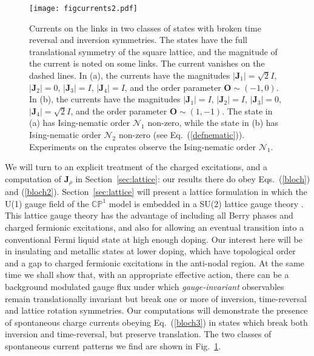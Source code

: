 \documentclass[aps,prb,preprint,onecolumn,citeautoscript,superscriptaddress,footinbib,
eqsecnum]{revtex4-1}
\begin{document}
\begin{figure}
\begin{center}
\texttt{[image: figcurrents2.pdf]}
\end{center}
\caption{Currents on the links in two classes of states with broken time reversal and inversion symmetries.
The states have the full translational symmetry of the
square lattice, and the magnitude of the current is noted on some links. The current vanishes on the dashed lines. In (a), the currents have the magnitudes $|{\bm J}_1| = \sqrt{2} I$, $|{\bm J}_2| = 0$, $|{\bm J}_3| = I$, $|{\bm J}_4| = I$, and the order parameter ${\bm O} \sim (-1,0)$.
In (b), the currents have the magnitudes $|{\bm J}_1| =  I$, $|{\bm J}_2| = I$, $|{\bm J}_3| = 0$, $|{\bm J}_4| = \sqrt{2} I$, and the order parameter ${\bm O} \sim (1,-1)$. The state in (a) has Ising-nematic order $\mathcal{N}_1$ non-zero, while the state in (b) has Ising-nematic order
$\mathcal{N}_2$ non-zero (see Eq.~(\ref{defnematic})). Experiments on the cuprates \cite{2002PhRvL..88m7005A,Hinkov597,2010Natur.463..519D,2010Natur.466..347L} observe the Ising-nematic order $\mathcal{N}_1$.
}
\label{fig:currents2}
\end{figure}
We will turn to an explicit treatment of the charged excitations, and a computation of ${\bm J}_{\rho}$ in Section~\ref{sec:lattice}: our results there do obey Eqs.~(\ref{bloch}) and (\ref{bloch2}). 
Section~\ref{sec:lattice} 
will present a lattice formulation in which the U(1) gauge field of the $\mathbb{CP}^1$ model is embedded in a SU(2) lattice gauge theory \cite{SS09,DCSS15b,DCSS16,2016PhRvB..94k5147S}. This lattice gauge theory 
has the advantage of including all Berry phases and charged fermionic excitations,  and also for allowing an eventual
transition into a conventional Fermi liquid state at high enough doping. Our interest here will be in insulating and metallic states at lower
doping, which have topological order and a gap to charged fermionic excitations in the anti-nodal region. At the same time we shall show that, with an appropriate
effective action, there can be a background modulated gauge flux under which {\it gauge-invariant} 
observables remain translationally invariant
but break one or more of inversion, time-reversal and lattice rotation symmetries. Our computations will demonstrate the presence of spontaneous 
charge currents obeying Eq.~(\ref{bloch3}) in states which break both inversion and time-reversal, but preserve translation. The two classes of spontaneous current patterns we find are shown in Fig.~\ref{fig:currents2}.
\end{document}
